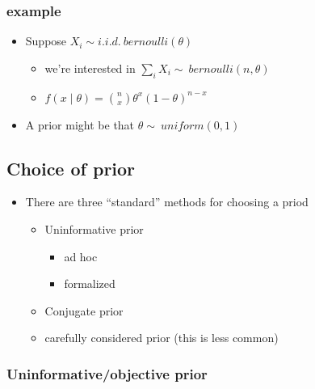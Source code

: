 \subsubsection{example}

\begin{itemize}[leftmargin=0pt]
\item Suppose $X_i \sim i.i.d.\ bernoulli(\theta)$
\begin{itemize}
\item we're interested in $\sum_i X_i \sim\ bernoulli(n, \theta)$
\item $f(x \mid \theta) = \binom{n}{x} \theta^x (1-\theta)^{n-x}$
\end{itemize}
\item A prior might be that $\theta \sim\ uniform(0,1)$
\end{itemize}

\subsection{Choice of prior}

\begin{itemize}[leftmargin=0pt]
\item There are three ``standard'' methods for choosing a priod
\begin{itemize}
\item Uninformative prior
\begin{itemize}
\item ad hoc
\item formalized
\end{itemize}
\item Conjugate prior
\item carefully considered prior (this is less common)
\end{itemize}
\end{itemize}

\subsubsection{Uninformative/objective prior}

